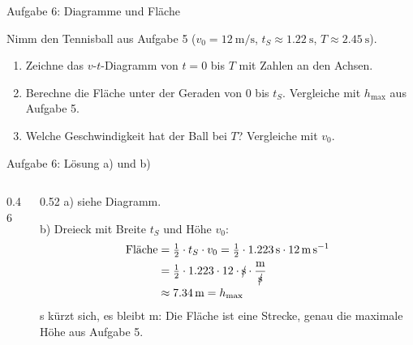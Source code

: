 \documentclass[14pt,aspectratio=169]{beamer}
\newcommand{\ein}[1]{\mathrm{#1}}
\newcommand{\kue}[1]{\cancel{\mathrm{#1}}}
\begin{document}
\begin{frame}{Aufgabe 6: Diagramme und Fläche}
  \begin{aufgabebox}[Aufgabe 6]
    \small
    Nimm den Tennisball aus Aufgabe 5 ($v_0=\SI{12}{\meter\per\second}$,
    $t_S\approx\SI{1.22}{\second}$, $T\approx\SI{2.45}{\second}$).
    \begin{enumerate}
      \item[a)] Zeichne das $v$-$t$-Diagramm von $t=0$ bis $T$ mit
        Zahlen an den Achsen.
      \item[b)] Berechne die Fläche unter der Geraden von $0$ bis $t_S$.
        Vergleiche mit $h_{\max}$ aus Aufgabe 5.
      \item[c)] Welche Geschwindigkeit hat der Ball bei $T$? Vergleiche
        mit $v_0$.
    \end{enumerate}
  \end{aufgabebox}
\end{frame}

\begin{frame}{Aufgabe 6: Lösung a) und b)}
  \begin{columns}[c]
    \begin{column}{0.46\textwidth}
      \centering
    \end{column}
    \begin{column}{0.52\textwidth}
      \small
      a) siehe Diagramm.

      \vspace{0.3em}
      b) Dreieck mit Breite $t_S$ und Höhe $v_0$:
      \begin{align*}
        \text{Fläche} &= \tfrac12\cdot t_S\cdot v_0
           = \tfrac12\cdot\SI{1.223}{\second}\cdot\SI{12}{\meter\per\second}\\
          &= \tfrac12\cdot1.223\cdot12\cdot\kue{s}\cdot\frac{\ein{m}}{\kue{s}}\\
          &\approx\SI{7.34}{\meter}=h_{\max}
      \end{align*}
      \footnotesize
      s kürzt sich, es bleibt m: Die Fläche ist eine Strecke, genau die
      maximale Höhe aus Aufgabe 5.
    \end{column}
  \end{columns}
\end{frame}
\end{document}
